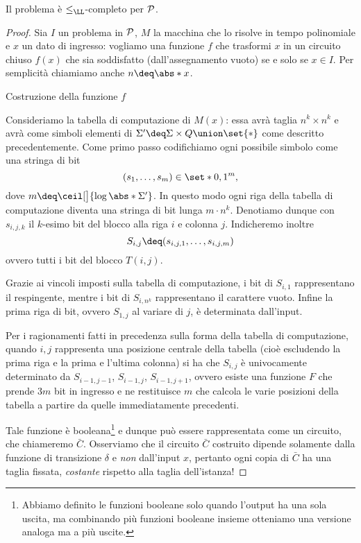 \begin{theorem}
  Il problema \CVAL{} è $\leq_{\LL}$-completo per $\P$.   
\end{theorem}
\begin{proof}
  Sia $I$ un problema in $\P$, $M$ la macchina che lo risolve in tempo polinomiale
  e $x$ un dato di ingresso: vogliamo una funzione $f$ che trasformi $x$ in un
  circuito chiuso $f(x)$ che sia soddisfatto (dall'assegnamento vuoto) se e solo
  se $x \in I$. Per semplicità chiamiamo anche $n \deq \abs*{x}$. 
  
  \medskip
  \textsf{\color{RoyalBlue} Costruzione della funzione $f$}

  Consideriamo la tabella di computazione di $M(x)$: essa avrà taglia
  $n^{\!k} \times n^{\!k}$ e avrà come simboli elementi di 
  $\Sigma' \deq \Sigma \times Q \union \set{\ast}$ come descritto precedentemente.
  Come primo passo codifichiamo ogni possibile simbolo come una stringa di bit
  \[
      (s_1, \dots, s_m) \in \set*{0, 1}^m,
  \] dove $m \deq \ceil[\big]{\log \abs*{\Sigma'}}$. In questo modo ogni riga
  della tabella di computazione diventa una stringa di bit lunga $m \cdot n^{\!k}$.
  Denotiamo dunque con $s_{i, j, k}$ il $k$-esimo bit del blocco alla riga $i$ e
  colonna $j$. Indicheremo inoltre \[
      S_{i, j} \deq (s_{i, j, 1}, \dots, s_{i, j, m})
  \] ovvero tutti i bit del blocco $T(i, j)$.  
  
  Grazie ai vincoli imposti sulla tabella di computazione, i bit di $S_{i, 1}$
  rappresentano il respingente, mentre i bit di $S_{i, n^{\!k}}$ rappresentano
  il carattere vuoto. Infine la prima riga di bit, ovvero $S_{1, j}$ al variare
  di $j$, è determinata dall'input.
  
  Per i ragionamenti fatti in precedenza sulla forma della tabella di computazione,
  quando $i, j$ rappresenta una posizione centrale della tabella (cioè escludendo
  la prima riga e la prima e l'ultima colonna) si ha che $S_{i, j}$ è univocamente
  determinato da $S_{i-1, j-1}$, $S_{i-1, j}$, $S_{i-1, j+1}$, ovvero esiste una
  funzione $F$ che prende $3m$ bit in ingresso e ne restituisce $m$ che calcola
  le varie posizioni della tabella a partire da quelle immediatamente precedenti.
  
  Tale funzione è booleana\footnote{Abbiamo definito le funzioni booleane solo
  quando l'output ha una sola uscita, ma combinando più funzioni booleane insieme
  otteniamo una versione analoga ma a più uscite.} e dunque può essere rappresentata
  come un circuito, che chiameremo $\bar C$.  
  Osserviamo che il circuito $\bar C$ costruito dipende solamente dalla funzione di
  transizione $\delta$ e \emph{non} dall'input $x$, pertanto ogni copia di $\bar C$
  ha una taglia fissata, \emph{costante} rispetto alla taglia dell'istanza!
  

\end{proof}
